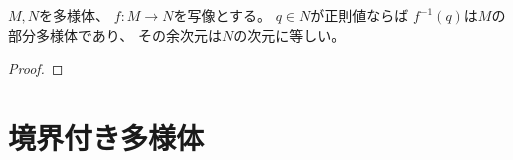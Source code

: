\documentclass[report]{jlreq}
\begin{document}
\begin{theorem}
    $M, N$を多様体、
    $f \colon M \to N$を{\smooth}写像とする。
    $q \in N$が正則値ならば
    $f^{-1}(q)$は$M$の部分多様体であり、
    その余次元は$N$の次元に等しい。
\end{theorem}

\begin{proof}
    \TODO{}
\end{proof}

%
\section{境界付き多様体}


\end{document}
